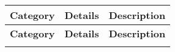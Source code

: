 \begin{table}[h!]
    {
    \setlength{\parindent}{0pt}
    \def\arraystretch{1.25}
    {\fontsize{9}{11}\selectfont
    \begin{longtable}{lp{}p{}}
        \rowcolor{gray}\textbf{\color{white}Category} & \textbf{\color{white}Details} & \textbf{\color{white}Description} \\
        \hline
        \endfirsthead %
        
        \hline
        \rowcolor{gray}\textbf{Category} & \textbf{Details} & \textbf{Description} \\
        \hline
        \endhead %
        
        \hline
        \endfoot %
        
        \hline
        \endlastfoot %


\end{longtable}}}
\end{table}

